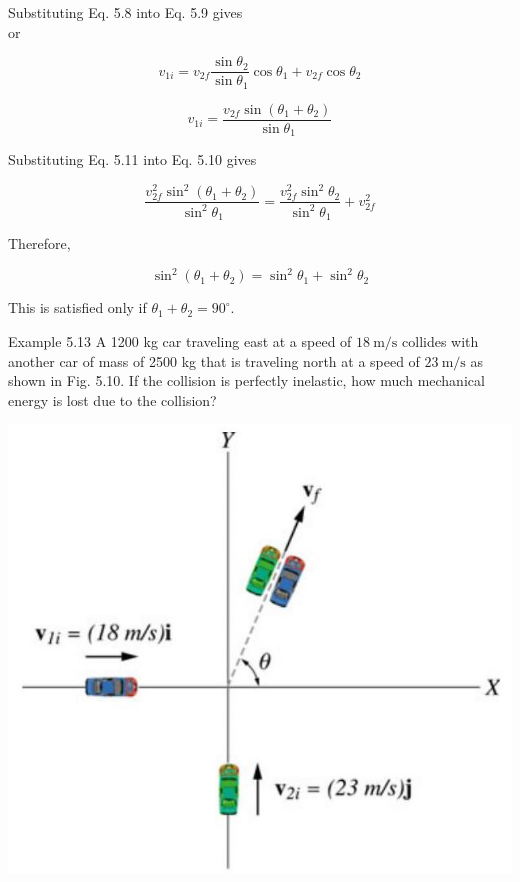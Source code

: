 \documentclass[10pt]{article}
\begin{document}
Substituting Eq. 5.8 into Eq. 5.9 gives\\
or

$$
v_{1 i}=v_{2 f} \frac{\sin \theta_{2}}{\sin \theta_{1}} \cos \theta_{1}+v_{2 f} \cos \theta_{2}
$$


\begin{equation*}
v_{1 i}=\frac{v_{2 f} \sin \left(\theta_{1}+\theta_{2}\right)}{\sin \theta_{1}} \tag{5.11}
\end{equation*}


Substituting Eq. 5.11 into Eq. 5.10 gives

$$
\frac{v_{2 f}^{2} \sin ^{2}\left(\theta_{1}+\theta_{2}\right)}{\sin ^{2} \theta_{1}}=\frac{v_{2 f}^{2} \sin ^{2} \theta_{2}}{\sin ^{2} \theta_{1}}+v_{2 f}^{2}
$$

Therefore,

$$
\sin ^{2}\left(\theta_{1}+\theta_{2}\right)=\sin ^{2} \theta_{1}+\sin ^{2} \theta_{2}
$$

This is satisfied only if $\theta_{1}+\theta_{2}=90^{\circ}$.

Example 5.13 A 1200 kg car traveling east at a speed of $18 \mathrm{~m} / \mathrm{s}$ collides with another car of mass of 2500 kg that is traveling north at a speed of $23 \mathrm{~m} / \mathrm{s}$ as shown in Fig. 5.10. If the collision is perfectly inelastic, how much mechanical energy is lost due to the collision?

\begin{center}
\includegraphics[max width=\textwidth]{2024_09_13_db1f357d2aad0a03eb2eg-089}
\end{center}
\end{document}
